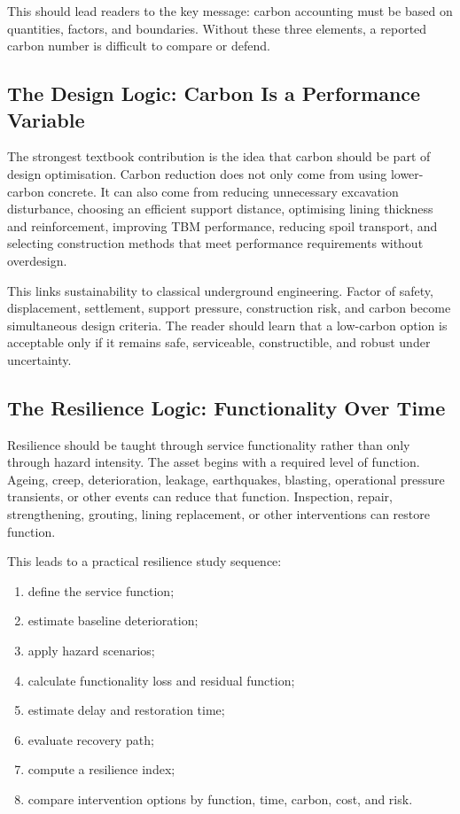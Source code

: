 \documentclass[11pt]{article}
\begin{document}
This should lead readers to the key message: carbon accounting must be based on
quantities, factors, and boundaries. Without these three elements, a reported
carbon number is difficult to compare or defend.

\subsection{The Design Logic: Carbon Is a Performance Variable}

The strongest textbook contribution is the idea that carbon should be part of
design optimisation. Carbon reduction does not only come from using lower-carbon
concrete. It can also come from reducing unnecessary excavation disturbance,
choosing an efficient support distance, optimising lining thickness and
reinforcement, improving TBM performance, reducing spoil transport, and
selecting construction methods that meet performance requirements without
overdesign.

This links sustainability to classical underground engineering. Factor of
safety, displacement, settlement, support pressure, construction risk, and
carbon become simultaneous design criteria. The reader should learn that a
low-carbon option is acceptable only if it remains safe, serviceable,
constructible, and robust under uncertainty.

\subsection{The Resilience Logic: Functionality Over Time}

Resilience should be taught through service functionality rather than only
through hazard intensity. The asset begins with a required level of function.
Ageing, creep, deterioration, leakage, earthquakes, blasting, operational
pressure transients, or other events can reduce that function. Inspection,
repair, strengthening, grouting, lining replacement, or other interventions can
restore function.

This leads to a practical resilience study sequence:

\begin{enumerate}
  \item define the service function;
  \item estimate baseline deterioration;
  \item apply hazard scenarios;
  \item calculate functionality loss and residual function;
  \item estimate delay and restoration time;
  \item evaluate recovery path;
  \item compute a resilience index;
  \item compare intervention options by function, time, carbon, cost, and risk.
\end{enumerate}
\end{document}
